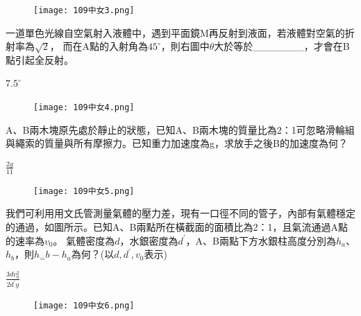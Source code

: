 \documentclass[cn,10pt,math=newtx]{elegantbook}
\begin{document}
\begin{figure}[htbp]
  \flushright
  \texttt{[image: 109中女3.png]}
\end{figure}
\newpage
\begin{example}
  一道單色光線自空氣射入液體中，遇到平面鏡M再反射到液面，若液體對空氣的折射率為$\sqrt{2}$，
  而在A點的入射角為$45^\circ$，則右圖中$\theta$大於等於\_\_\_\_\_\_\_，才會在B點引起全反射。\\
  \rightline{[台中女中教甄109]} 
\end{example}
\begin{solution}
  $7.5^\circ$
\end{solution}
\begin{figure}[htbp]
  \flushright
  \texttt{[image: 109中女4.png]}
\end{figure}
\newpage
\begin{example}
  A、B兩木塊原先處於靜止的狀態，已知A、B兩木塊的質量比為2：1可忽略滑輪組與繩索的質量與所有摩擦力。已知重力加速度為g，求放手之後B的加速度為何？\\
  \rightline{[台中女中教甄109]}
\end{example}
\begin{solution}
  $\frac{2g}{11}$
\end{solution}
\begin{figure}[htbp]
  \flushright
  \texttt{[image: 109中女5.png]}
\end{figure}
\newpage
\begin{example}
  我們可利用用文氏管測量氣體的壓力差，現有一口徑不同的管子，內部有氣體穩定的通過，如圖所示。已知A、B兩點所在橫截面的面積比為2：1，且氣流通過A點的速率為$v_0$。
  氣體密度為$d$，水銀密度為$d^\prime$，A、B兩點下方水銀柱高度分別為$h_a$、$h_b$，則$h_=b-h_a$為何？(以$d, d^\prime, v_0$表示)\\
  \rightline{[台中女中教甄109]}
\end{example}
\begin{solution}
  $\frac{3dv_{0}^{2}}{2d^\prime g}$
\end{solution}
\begin{figure}[htbp]
  \flushright
  \texttt{[image: 109中女6.png]}
\end{figure}
\newpage
\end{document}
